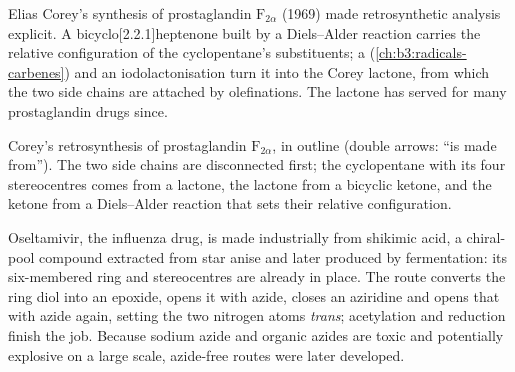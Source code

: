 Elias Corey's synthesis of prostaglandin $\mathrm F_{2\alpha}$ (1969) made retrosynthetic analysis
explicit. A bicyclo[2.2.1]heptenone built by a Diels--Alder reaction carries
the relative configuration of the cyclopentane's substituents; a
 (\cref{ch:b3:radicals-carbenes}) and an
iodolactonisation turn it into the Corey lactone, from which the two side chains
are attached by olefinations. The lactone has served for many prostaglandin
drugs since.

\begin{omfigure}

{\small Corey's retrosynthesis of prostaglandin $\mathrm F_{2\alpha}$, in outline (double arrows: ``is
made from''). The two side chains are disconnected first; the cyclopentane with
its four stereocentres comes from a lactone, the lactone from a bicyclic ketone,
and the ketone from a Diels--Alder reaction that sets their relative
configuration.}
\end{omfigure}

Oseltamivir, the influenza drug, is made industrially from shikimic acid, a
chiral-pool compound extracted from star anise and later produced by
fermentation: its six-membered ring and stereocentres are already in place.
The route converts the ring diol into an epoxide, opens it with azide, closes an
aziridine and opens that with azide again, setting the two nitrogen atoms
\textit{trans}; acetylation and reduction finish the job. Because sodium azide and
organic azides are toxic and potentially explosive on a large scale, azide-free
routes were later developed.

